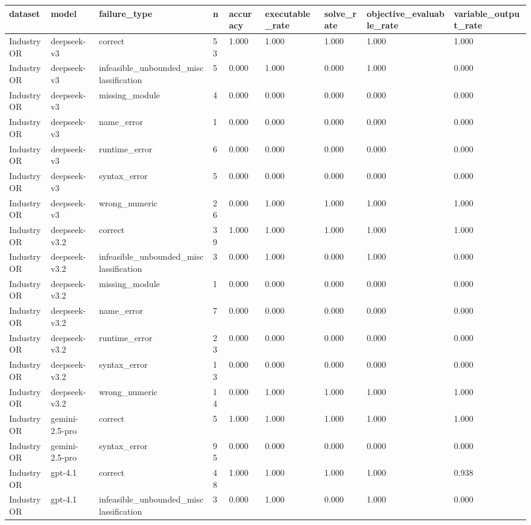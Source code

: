 \begin{table}[t]
\centering
\small
\begin{tabular}{lllllllll}
\toprule
dataset & model & failure\_type & n & accuracy & executable\_rate & solve\_rate & objective\_evaluable\_rate & variable\_output\_rate \\
\midrule
IndustryOR & deepseek-v3 & correct & 53 & 1.000 & 1.000 & 1.000 & 1.000 & 1.000 \\
IndustryOR & deepseek-v3 & infeasible\_unbounded\_misclassification & 5 & 0.000 & 1.000 & 0.000 & 1.000 & 0.000 \\
IndustryOR & deepseek-v3 & missing\_module & 4 & 0.000 & 0.000 & 0.000 & 0.000 & 0.000 \\
IndustryOR & deepseek-v3 & name\_error & 1 & 0.000 & 0.000 & 0.000 & 0.000 & 0.000 \\
IndustryOR & deepseek-v3 & runtime\_error & 6 & 0.000 & 0.000 & 0.000 & 0.000 & 0.000 \\
IndustryOR & deepseek-v3 & syntax\_error & 5 & 0.000 & 0.000 & 0.000 & 0.000 & 0.000 \\
IndustryOR & deepseek-v3 & wrong\_numeric & 26 & 0.000 & 1.000 & 1.000 & 1.000 & 1.000 \\
IndustryOR & deepseek-v3.2 & correct & 39 & 1.000 & 1.000 & 1.000 & 1.000 & 1.000 \\
IndustryOR & deepseek-v3.2 & infeasible\_unbounded\_misclassification & 3 & 0.000 & 1.000 & 0.000 & 1.000 & 0.000 \\
IndustryOR & deepseek-v3.2 & missing\_module & 1 & 0.000 & 0.000 & 0.000 & 0.000 & 0.000 \\
IndustryOR & deepseek-v3.2 & name\_error & 7 & 0.000 & 0.000 & 0.000 & 0.000 & 0.000 \\
IndustryOR & deepseek-v3.2 & runtime\_error & 23 & 0.000 & 0.000 & 0.000 & 0.000 & 0.000 \\
IndustryOR & deepseek-v3.2 & syntax\_error & 13 & 0.000 & 0.000 & 0.000 & 0.000 & 0.000 \\
IndustryOR & deepseek-v3.2 & wrong\_numeric & 14 & 0.000 & 1.000 & 1.000 & 1.000 & 1.000 \\
IndustryOR & gemini-2.5-pro & correct & 5 & 1.000 & 1.000 & 1.000 & 1.000 & 1.000 \\
IndustryOR & gemini-2.5-pro & syntax\_error & 95 & 0.000 & 0.000 & 0.000 & 0.000 & 0.000 \\
IndustryOR & gpt-4.1 & correct & 48 & 1.000 & 1.000 & 1.000 & 1.000 & 0.938 \\
IndustryOR & gpt-4.1 & infeasible\_unbounded\_misclassification & 3 & 0.000 & 1.000 & 0.000 & 1.000 & 0.000 \\

\end{tabular}
\end{table}
